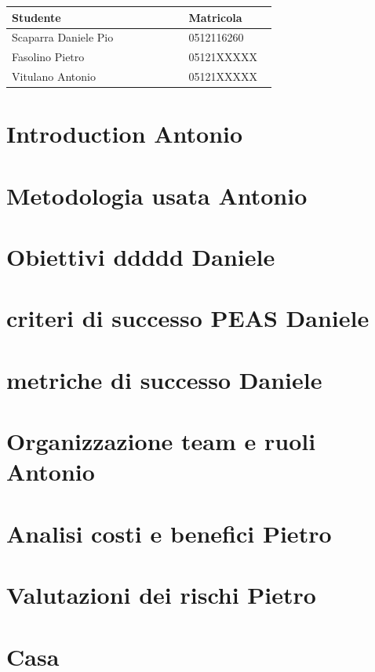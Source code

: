 \documentclass{article}
\title{}
\author{} %
\date{} %
\begin{document}
\maketitle

\begin{center}
\begin{tabular}{|p{0.6\linewidth}|p{0.3\linewidth}|}
\hline
    \textbf{Studente} & \textbf{Matricola} \\
\hline
    Scaparra Daniele Pio & 0512116260 \\
\hline
    Fasolino Pietro & 05121XXXXX \\
\hline
    Vitulano Antonio & 05121XXXXX \\
\hline
\end{tabular}
\end{center}

\section{Introduction Antonio}\label{sec:introduction-antonio}

\section{Metodologia usata Antonio}\label{sec:metodologia-usata-antonio}

\section{Obiettivi ddddd Daniele}\label{sec:obiettivi-ddddd-daniele}

\section{criteri di successo PEAS Daniele}\label{sec:criteri-di-successo-peas-daniele}

\section{metriche di successo Daniele}\label{sec:metriche-di-successo-daniele}

\section{Organizzazione team e ruoli Antonio}\label{sec:organizzazione-team-e-ruoli-antonio}

\section{Analisi costi e benefici Pietro}\label{sec:analisi-costi-e-benefici-pietro}

\section{Valutazioni dei rischi Pietro}\label{sec:valutazioni-dei-rischi-pietro}
    
\section{Casa}\label{sec:casa}
\end{document}
